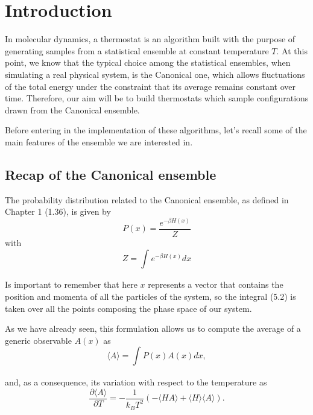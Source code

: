 \section{Introduction}
In molecular dynamics, a thermostat is an algorithm built with the purpose of generating samples from a statistical ensemble at constant temperature $T$.
At this point, we know that the typical choice among the statistical ensembles, when simulating a real physical system, is the Canonical one, which allows fluctuations of the total energy under the constraint that its average remains constant over time.
Therefore, our aim will be to build thermostats which sample configurations drawn from the Canonical ensemble. 

Before entering in the implementation of these algorithms, let's recall some of the main features of the ensemble we are interested in.

\subsection{Recap of the Canonical ensemble}
The probability distribution related to the Canonical ensemble, as defined in Chapter 1 (1.36), is given by
\begin{equation}
     P(x)=\frac{e^{-\beta H(x)}}{Z}
\end{equation}
with 
\begin{equation}
     Z=\int_ {}^{} e^{-\beta H(x)}dx
\label{zetafunc}
\end{equation} 

\par Is important to remember that here $x$ represents a vector that contains the position and momenta of all the particles of the system, so the integral (5.2) is taken over all the points composing the phase space of our system. 

As we have already seen, this formulation allows us to compute the average of a generic observable $A(x)$ as
\begin{equation}
     \langle A \rangle =\int_ {}^{} P(x)A(x)dx,
\end{equation}

and, as a consequence, its variation with respect to the temperature as
\begin{equation}
    \frac{\partial \langle A \rangle}{\partial T}=-\frac{1}{k_B T^2} (-\langle HA \rangle+\langle H \rangle\langle A\rangle). 
\end{equation}

